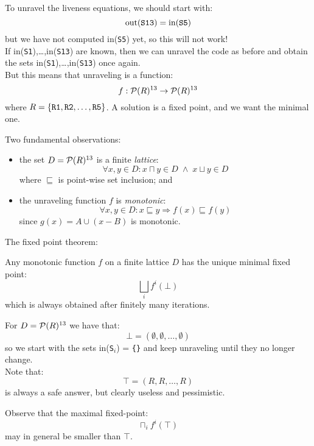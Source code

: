 \begin{slide*}
To unravel the liveness equations, we should start with:
$$\mbox{out({\tt S13})} = \mbox{in({\tt S5})}$$
but we have not computed in({\tt S5}) yet, so this will not work!\\

If in({\tt S1}),\ldots,in({\tt S13}) are known, then we can unravel the code as before
and obtain the sets in({\tt S1}),\ldots,in({\tt S13}) once again.\\

But this means that unraveling is a function:
$$ f: {\cal P}(R)^{13} \rightarrow {\cal P}(R)^{13} $$
where $R = \{\mbox{\tt R1},\mbox{\tt R2},\ldots,\mbox{\tt R5}\}$.
A solution is a fixed point, and we want the minimal one.
\vfil
\end{slide*}
 
\begin{slide*}
Two fundamental observations:
\begin{itemize}
\item the set $D = {\cal P}(R)^{13}$ is a finite {\em lattice}:
      $$ \forall x,y\in D: x\sqcap y \in D \;\wedge\; x\sqcup y\in D$$
      where $\sqsubseteq$ is point-wise set inclusion; and
\item the unraveling function $f$ is {\em monotonic}:
      $$ \forall x,y\in D: x\sqsubseteq y \Rightarrow f(x) \sqsubseteq f(y)$$
      since $g(x) = A \cup (x - B)$ is monotonic.
\end{itemize}
\vspace*{2ex}

The fixed point theorem:

Any monotonic function $f$ on a finite lattice $D$ has the unique minimal fixed point:
$$ \bigsqcup_i f^i(\bot) $$
which is always obtained after finitely many iterations.
\vfil
\end{slide*}
 
\begin{slide*}
For $D = {\cal P}(R)^{13}$ we have that:
$$ \bot = (\emptyset,\emptyset,\ldots,\emptyset) $$
so we start with the sets in({\tt S$_i$}) = \mbox{\tt \{\}} and keep unraveling
until they no longer change. \\

Note that:
$$ \top = (R,R,\ldots,R) $$
is always a safe answer, but clearly useless and
pessimistic.

Observe that the maximal fixed-point:
$$ \sqcap_i f^i(\top) $$
may in general be smaller than $\top$.
\vfil
\end{slide*}


